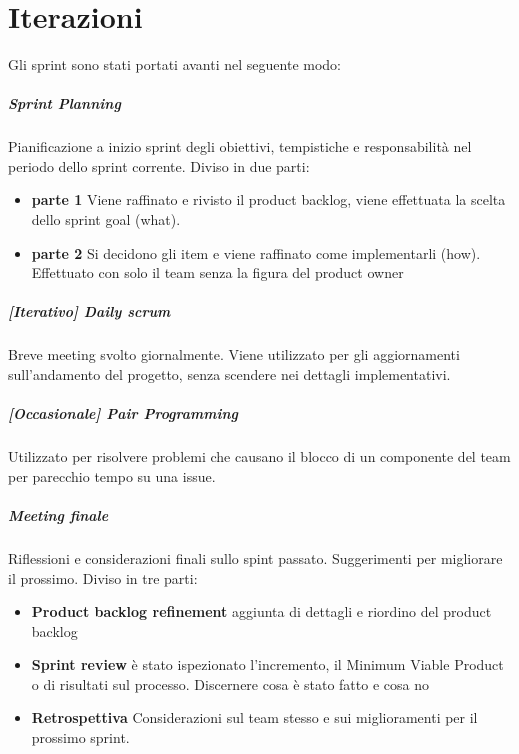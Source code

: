 \chapter{Iterazioni}
Gli sprint sono stati portati avanti nel seguente modo:
    \paragraph{Sprint Planning}
        Pianificazione a inizio sprint degli obiettivi, tempistiche e responsabilità nel periodo dello sprint corrente. Diviso in due parti:
        \begin{itemize}
        \item\textbf{parte 1} 
            Viene raffinato e rivisto il product backlog, viene effettuata la scelta dello sprint goal (what).
        \item\textbf{parte 2}
            Si decidono gli item e viene raffinato come implementarli (how). Effettuato con solo il team senza la figura del product owner
        \end{itemize}
    \paragraph{[Iterativo] Daily scrum} Breve meeting svolto giornalmente. Viene utilizzato per gli aggiornamenti sull'andamento del progetto, senza scendere nei dettagli implementativi.
    \paragraph{[Occasionale] Pair Programming } Utilizzato per risolvere problemi che causano il blocco di un componente del team per parecchio tempo su una issue.
    \paragraph{Meeting finale}
        Riflessioni e considerazioni finali sullo spint passato. Suggerimenti per migliorare il prossimo. Diviso in tre parti: 
        \begin{itemize}
        \item\textbf{Product backlog refinement} aggiunta di dettagli e riordino del product backlog
        \item\textbf{Sprint review} è stato ispezionato l'incremento, il Minimum Viable Product o di risultati sul processo. Discernere cosa è stato fatto e cosa no
        \item\textbf{Retrospettiva} Considerazioni sul team stesso e sui miglioramenti per il prossimo sprint. 
        \end{itemize}

